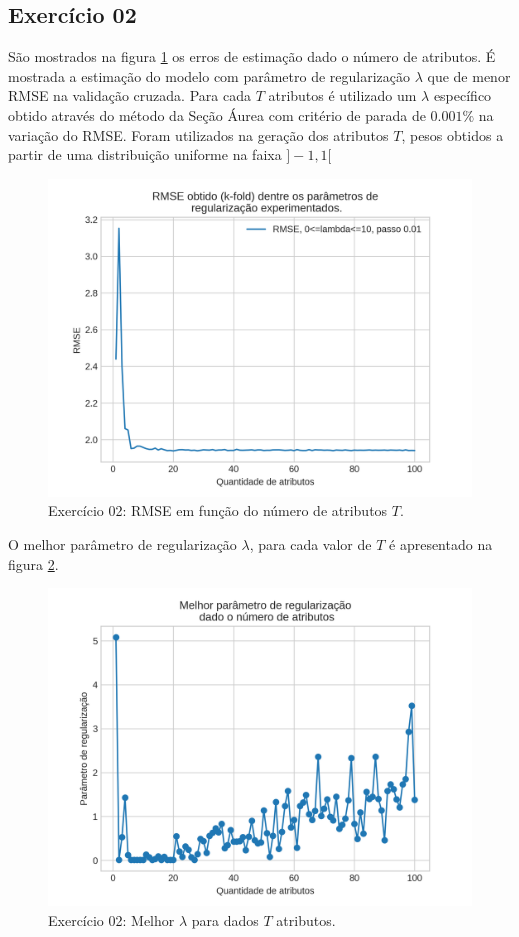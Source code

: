 \documentclass{article}
\begin{document}
    \newpage
    \subsection[]{Exercício 02}
    São mostrados na figura \ref{fig:ex2_TRMSE} os erros de estimação dado o número de atributos.
    É mostrada a estimação do modelo com parâmetro de regularização $\lambda$ que de menor RMSE na validação cruzada.
    Para cada $T$ atributos é utilizado um $\lambda$ específico obtido através do
    método da Seção Áurea com critério de parada de $0.001\%$ na variação do RMSE.
    Foram utilizados na geração dos atributos $T$,
    pesos obtidos a partir de uma distribuição uniforme na faixa $]-1,1[$
    \begin{figure}[!h]
        \centering
        \includegraphics[width=\linewidth]{ex02/TsMeans.png}
        \caption{Exercício 02: RMSE em função do número de atributos $T$.}
        \label{fig:ex2_TRMSE}
    \end{figure}
    
    O melhor parâmetro de regularização $\lambda$, para cada valor de $T$ é apresentado na figura \ref{fig:ex2_Tlamb}.
    \begin{figure}[!h]
        \centering
        \includegraphics[width=\linewidth]{ex02/Tslambs.png}
        \caption{Exercício 02: Melhor $\lambda$ para dados $T$ atributos.}
        \label{fig:ex2_Tlamb}
    \end{figure}
 
\end{document}
